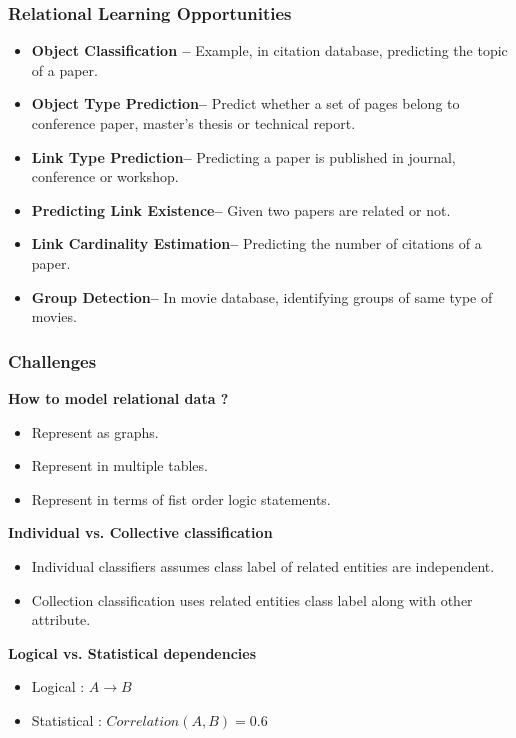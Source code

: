 \documentclass[10pt, blue,subsection=true, compress]{beamer}
\begin{document}
\begin{frame} \frametitle{Relational Learning Opportunities}
\begin{itemize}
\item \textbf{Object Classification --} Example, in citation database, predicting
the topic of a paper. 
\item \textbf{Object Type Prediction--} Predict whether a set of pages belong to 
conference paper, master's thesis or technical report.
\item \textbf{Link Type Prediction--} Predicting a paper is published in journal, conference or
workshop. 
\item \textbf{Predicting Link Existence--} Given two papers are related or not.
\item \textbf{Link Cardinality Estimation--} Predicting the number of citations of a paper.
\item \textbf{Group Detection--} In movie database, identifying groups of same type of
movies.
\end{itemize}

\end{frame} 

\begin{frame} \frametitle{Challenges}
\begin{block} {\textbf{How to model relational data ?}} 
\begin{itemize}
\item Represent as graphs.
\item Represent in multiple tables.
\item Represent in terms of fist order logic statements.
\end{itemize}
\end{block}

\begin{block}{\textbf{Individual vs. Collective classification}} 
\begin{itemize}
\item Individual classifiers assumes class label of related entities are independent.
\item Collection classification uses related entities class label along with other attribute.
\end{itemize}
\end{block}

\begin{block}{\textbf{Logical vs. Statistical dependencies}}
\begin{itemize}
\item Logical : $A \rightarrow B$
\item Statistical : $Correlation (A,B) = 0.6$
\end{itemize}
\end{block}
\end{frame} 
\end{document}
